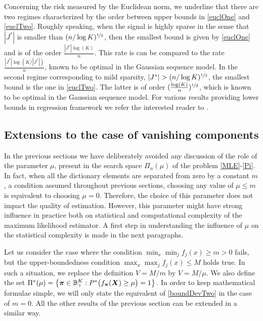 Concerning the risk measured by the Euclidean norm, we underline that there are two regimes
characterized by the order between upper bounds in \eqref{euclOne} and \eqref{euclTwo}.
Roughly speaking, when the signal is highly sparse in the sense that $|J^*|$ is
smaller than $(n/\log K)^{\nicefrac12}$, then the smallest bound is given by \eqref{euclOne} and
is of the order $\frac{|J^*|\log(K)}{n}$. This rate is can be compared to the
rate $\frac{|J^*|\log(K/|J^*|)}{n}$, known to be optimal in the Gaussian sequence model.
In the second regime corresponding to mild sparsity, $|J^*| > (n/\log K)^{\nicefrac12}$,
the smallest bound is the one in \eqref{euclTwo}. The latter is of order
$(\frac{\log(K)}{n})^{\nicefrac12}$, which is known to be optimal in the Gaussian sequence
model. For various results providing lower bounds in regression framework we refer
the interested reader to \citep{Rask11,RT11,Wang14}.

\subsection[Extensions]{Extensions to the case of vanishing components}
\label{ssec:vanish}

In the previous sections we have deliberately avoided any discussion of the role of the
parameter $\mu$, present in the search space $\Pi_n(\mu)$ of the problem \eqref{MLE}-\eqref{Pi}.
In fact, when all the dictionary elements are separated from zero by  a constant $m$, a
condition assumed throughout previous sections, choosing any value of $\mu\le m$ is equivalent
to choosing $\mu=0$. Therefore, the choice of this parameter does not impact the quality of
estimation. However, this parameter might have strong influence in practice both on statistical
and computational complexity of the maximum likelihood estimator. A first step in understanding
the influence of $\mu$ on the statistical complexity is made in the next paragraphs.

Let us consider the case where the condition $\min_x \min_j f_j(x)\ge m>0$ fails,
but the upper-boundedness condition $\max_x\max_j f_j(x)\le M$ holds true. In such a
situation, we replace the definition $V= M/m$ by $V=M/\mu$. We also define the set
$\Pi^*(\mu) = \big\{\boldsymbol \pi\in{\mathbb B}^K_+ : P^*\big(f_{\boldsymbol \pi}(\boldsymbol X)\ge \mu\big)=1\big\}$.
In order to keep mathematical formulae simple, we will only state the equivalent of
\eqref{boundDevTwo} in the case of $m=0$. All the other results of the previous
section can be extended in a similar way.

